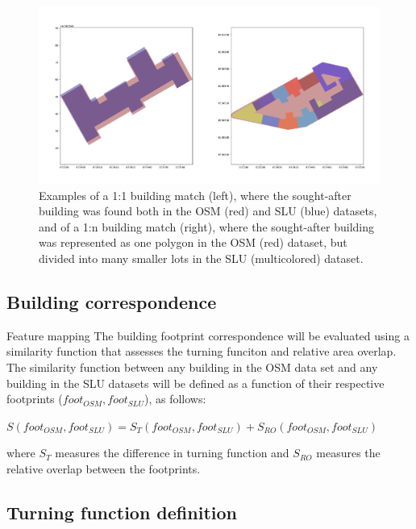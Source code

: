 \documentclass[a4paper]{article}
\begin{document}
\begin{figure}[H]
    \centering
    \includegraphics[width=\textwidth,height=0.5\textheight,keepaspectratio]{img_building_match}
    \caption{Examples of a 1:1 building match (left), where the sought-after building was found both in the OSM (red) and SLU (blue) datasets, and of a 1:n building match (right), where the sought-after building was represented as one polygon in the OSM (red) dataset, but divided into many smaller lots in the SLU (multicolored) dataset.}
    \label{fig:space}
\end{figure}

\subsection{Building correspondence}

Feature mapping
The building footprint correspondence will be evaluated using a similarity function that assesses the turning funciton and relative area overlap. The similarity function between any building in the OSM data set and any building in the SLU datasets will be defined as a function of their respective footprints ($foot_{OSM}, foot_{SLU}$), as follows:
\begin{center}
    $S(foot_{OSM}, foot_{SLU}) = S_{T}(foot_{OSM}, foot_{SLU}) + S_{RO}(foot_{OSM}, foot_{SLU})$
\end{center}
where $S_{T}$ measures the difference in turning function and $S_{RO}$ measures the relative overlap between the footprints.

\subsection{Turning function definition}
\end{document}
